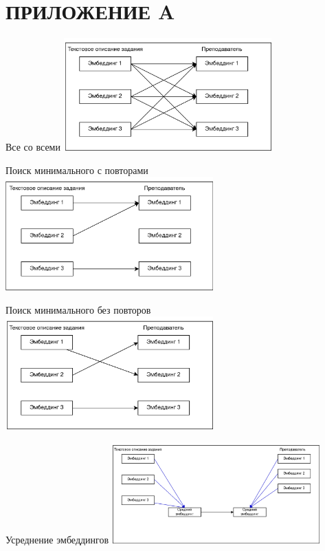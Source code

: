 \documentclass[PI,KR]{HSEUniversity}
\begin{document}
\chapter*{ПРИЛОЖЕНИЕ A}
\begin{FIGURE}[h]{Все со всеми \label{fig:Подбор исполнителя 1}}
	\includegraphics[width=0.6\textwidth]{img/Подбор исполнителя 1}
\end{FIGURE}
\begin{FIGURE}[h]{Поиск минимального с повторами \label{fig:Подбор исполнителя 2}}
	\includegraphics[width=0.6\textwidth]{img/Подбор исполнителя 2}
\end{FIGURE}
\begin{FIGURE}[h]{Поиск минимального без повторов \label{fig:Подбор исполнителя 3}}
	\includegraphics[width=0.6\textwidth]{img/Подбор исполнителя 3}
\end{FIGURE}
\begin{FIGURE}[h]{Усреднение эмбеддингов \label{fig:Подбор исполнителя 4}}
	\includegraphics[width=0.6\textwidth]{img/Подбор исполнителя 4}
\end{FIGURE}
\end{document}
